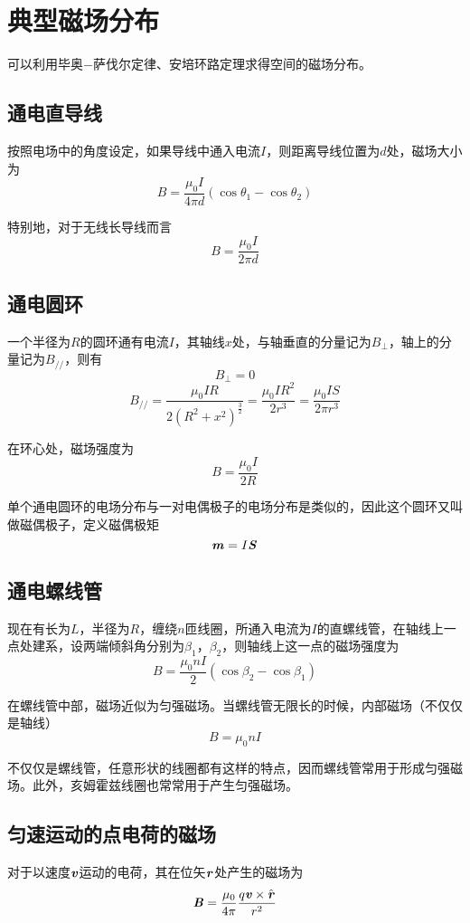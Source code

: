 \documentclass[UTF8,openany]{book}
\begin{document}
	\section{典型磁场分布}
	\par 可以利用毕奥$-$萨伐尔定律、安培环路定理求得空间的磁场分布。
	\subsection{通电直导线}
	\par 按照电场中的角度设定，如果导线中通入电流$I$，则距离导线位置为$d$处，磁场大小为
	$$B=\frac{\mu_0I}{4\pi d}(\cos\theta_1-\cos\theta_2)$$
	\par 特别地，对于无线长导线而言
	$$B=\frac{\mu_0I}{2\pi d}$$
	\subsection{通电圆环}
	\par 一个半径为$R$的圆环通有电流$I$，其轴线$x$处，与轴垂直的分量记为$B_\perp$，轴上的分量记为$B_{//}$，则有
	$$B_\perp=0$$
	$$B_{//}=\frac{\mu_0IR}{2(R^2+x^2)^\frac{3}{2}}=\frac{\mu_0IR^2}{2r^3}=\frac{\mu_0IS}{2\pi r^3}$$
	\par 在环心处，磁场强度为
	$$B=\frac{\mu_0I}{2R}$$
	\par 单个通电圆环的电场分布与一对电偶极子的电场分布是类似的，因此这个圆环又叫做磁偶极子，定义磁偶极矩
	$$\textbf{\textit{m}}=I\textbf{\textit{S}}$$
	\subsection{通电螺线管}
	\par 现在有长为$L$，半径为$R$，缠绕$n$匝线圈，所通入电流为$I$的直螺线管，在轴线上一点处建系，设两端倾斜角分别为$\beta_1$，$\beta_2$，则轴线上这一点的磁场强度为
	$$B=\frac{\mu_0nI}{2}(\cos\beta_2-\cos\beta_1)$$
	\par 在螺线管中部，磁场近似为匀强磁场。当螺线管无限长的时候，内部磁场（不仅仅是轴线）
	$$B=\mu_0nI$$
	\par 不仅仅是螺线管，任意形状的线圈都有这样的特点，因而螺线管常用于形成匀强磁场。此外，亥姆霍兹线圈也常常用于产生匀强磁场。
	\subsection{匀速运动的点电荷的磁场}
	\par 对于以速度$\textbf{\textit{v}}$运动的电荷，其在位矢$\textbf{\textit{r}}$处产生的磁场为
	$$\textbf{\textit{B}}=\frac{\mu_0}{4\pi}\frac{q\textbf{\textit{v}}\times\hat{\textbf{\textit{r}}}}{r^2}$$
\end{document}
